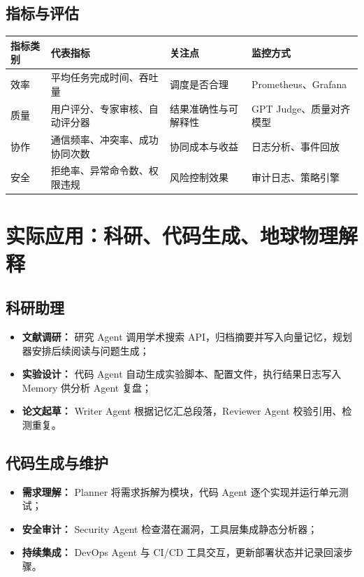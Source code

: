 \documentclass[UTF8,zihao=-4]{ctexart}
\begin{document}
\subsection{指标与评估}
\begin{longtable}{p{3cm}p{3cm}p{4cm}p{4cm}}
\toprule
指标类别 & 代表指标 & 关注点 & 监控方式 \\
\midrule
效率 & 平均任务完成时间、吞吐量 & 调度是否合理 & Prometheus、Grafana \\
质量 & 用户评分、专家审核、自动评分器 & 结果准确性与可解释性 & GPT Judge、质量对齐模型 \\
协作 & 通信频率、冲突率、成功协同次数 & 协同成本与收益 & 日志分析、事件回放 \\
安全 & 拒绝率、异常命令数、权限违规 & 风险控制效果 & 审计日志、策略引擎 \\
\bottomrule
\end{longtable}

\section{实际应用：科研、代码生成、地球物理解释}
\subsection{科研助理}
\begin{itemize}
  \item \textbf{文献调研：} 研究 Agent 调用学术搜索 API，归档摘要并写入向量记忆，规划器安排后续阅读与问题生成；
  \item \textbf{实验设计：} 代码 Agent 自动生成实验脚本、配置文件，执行结果日志写入 Memory 供分析 Agent 复盘；
  \item \textbf{论文起草：} Writer Agent 根据记忆汇总段落，Reviewer Agent 校验引用、检测重复。
\end{itemize}

\subsection{代码生成与维护}
\begin{itemize}
  \item \textbf{需求理解：} Planner 将需求拆解为模块，代码 Agent 逐个实现并运行单元测试；
  \item \textbf{安全审计：} Security Agent 检查潜在漏洞，工具层集成静态分析器；
  \item \textbf{持续集成：} DevOps Agent 与 CI/CD 工具交互，更新部署状态并记录回滚步骤。
\end{itemize}
\end{document}
